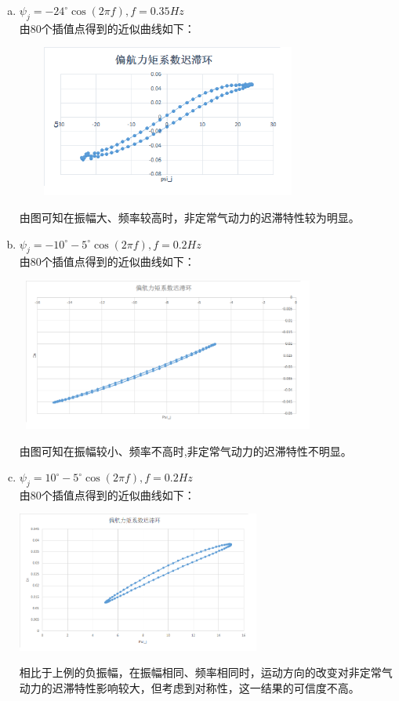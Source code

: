 \documentclass[UTF8]{ctexart}
\begin{document}
\begin{enumerate}[a)]

\item $\psi_j=-24^\circ \cos(2\pi f), f=0.35Hz$ \\ 
\indent 由80个插值点得到的近似曲线如下：
\begin{center}
\includegraphics[width=10cm,height=5cm]{../results/case1.png}
\end{center}
\indent 由图可知在振幅大、频率较高时，非定常气动力的迟滞特性较为明显。

\item $\psi_j=-10^\circ-5^\circ \cos(2\pi f), f=0.2Hz$ \\ 
\indent 由80个插值点得到的近似曲线如下：
\begin{center}
\includegraphics[width=10cm,height=5cm]{../results/case2.png}
\end{center}
\indent 由图可知在振幅较小、频率不高时,非定常气动力的迟滞特性不明显。

\item $\psi_j=10^\circ-5^\circ \cos(2\pi f),f=0.2Hz$ \\ 
\indent 由80个插值点得到的近似曲线如下：
\begin{center}
\includegraphics[width=8cm]{../results/case3.png}
\end{center}
\indent 相比于上例的负振幅，在振幅相同、频率相同时，运动方向的改变对非定常气动力的迟滞特性影响较大，但考虑到对称性，这一结果的可信度不高。


\end{enumerate}
\end{document}
